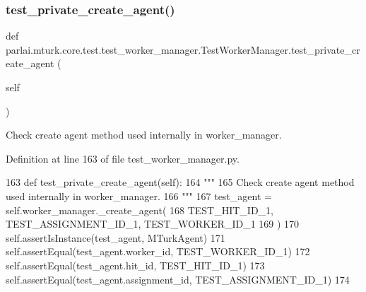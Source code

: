 \mbox{\label{classparlai_1_1mturk_1_1core_1_1test_1_1test__worker__manager_1_1TestWorkerManager_a1ef916fee345f95fdc29c89036598fd1}} 
\subsubsection{\texorpdfstring{test\+\_\+private\+\_\+create\+\_\+agent()}{test\_private\_create\_agent()}}
{\footnotesize\ttfamily def parlai.\+mturk.\+core.\+test.\+test\+\_\+worker\+\_\+manager.\+Test\+Worker\+Manager.\+test\+\_\+private\+\_\+create\+\_\+agent (\begin{DoxyParamCaption}\item[{}]{self }\end{DoxyParamCaption})}

\begin{DoxyVerb}Check create agent method used internally in worker_manager.
\end{DoxyVerb}
 

Definition at line 163 of file test\+\_\+worker\+\_\+manager.\+py.


\begin{DoxyCode}
163     \textcolor{keyword}{def }test\_private\_create\_agent(self):
164         \textcolor{stringliteral}{"""}
165 \textcolor{stringliteral}{        Check create agent method used internally in worker\_manager.}
166 \textcolor{stringliteral}{        """}
167         test\_agent = self.worker\_manager.\_create\_agent(
168             TEST\_HIT\_ID\_1, TEST\_ASSIGNMENT\_ID\_1, TEST\_WORKER\_ID\_1
169         )
170         self.assertIsInstance(test\_agent, MTurkAgent)
171         self.assertEqual(test\_agent.worker\_id, TEST\_WORKER\_ID\_1)
172         self.assertEqual(test\_agent.hit\_id, TEST\_HIT\_ID\_1)
173         self.assertEqual(test\_agent.assignment\_id, TEST\_ASSIGNMENT\_ID\_1)
174 
\end{DoxyCode}
\mbox{\label{classparlai_1_1mturk_1_1core_1_1test_1_1test__worker__manager_1_1TestWorkerManager_ab961573ebc6d1d4c3fc22fa4be8f1e76}} 
